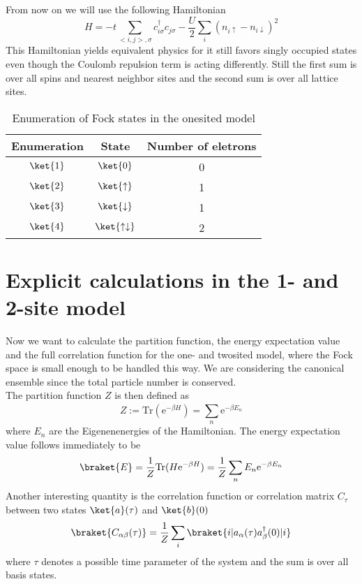 \noindent From now on we will use the following Hamiltonian 
\begin{equation}
	H = -t \sum_{<i,j>, \sigma} c_{i\sigma}^\dag c_{j\sigma} - \frac{U}{2} \sum_{i}(n_{i\uparrow} - n_{i\downarrow})^2 
	\label{Hnew}
\end{equation}
This Hamiltonian yields equivalent physics for it still favors singly occupied states even though the Coulomb repulsion term is acting differently. Still the first sum is over all spins and nearest neighbor sites and the second sum is over all lattice sites.
\newline
\begin{table}[H]
	\centering
	
	\begin{tabular}{ccc}
		
		\hline  
		Enumeration & State & Number of eletrons \\
		\hline
		$\ket{1}$ & $\ket{0}$ & 0\\
		$\ket{2}$ & $\ket{\uparrow}$ & 1\\
		$\ket{3}$ & $\ket{\downarrow}$ & 1\\
		$\ket{4}$ & $\ket{\uparrow\downarrow}$ & 2\\
	\end{tabular}
	\caption{Enumeration of Fock states in the onesited model}
	\label{fock1}
\end{table}
\section{Explicit calculations in the 1- and 2-site model}\label{analytic}
Now we want to calculate the partition function, the energy expectation value and the full correlation function for the one- and twosited model, where the Fock space is small enough to be handled this way. We are considering the canonical ensemble since the total particle number is conserved.\\
The partition function $Z$ is then defined as 
\begin{equation}
Z := \text{Tr}(\text{e}^{-\beta H}) = \sum_{n}^{}\text{e}^{-\beta E_n} \label{partition}
\end{equation}
where $E_n$ are the Eigenenenergies of the Hamiltonian. The energy expectation value follows immediately to be
\begin{equation}
\braket{E} = \frac{1}{Z}\text{Tr} (H\text{e}^{-\beta H}) =\frac{1}{Z} \sum_{n}^{} E_n\text{e}^{-\beta E_n} \label{energy}
\end{equation}
Another interesting quantity is the correlation function or correlation matrix $C_{\tau}$ between two states $\ket{a}(\tau)$ and $\ket{b}(0)$
\begin{equation}
	\braket{C_{\alpha\beta}(\tau)}= \frac{1}{Z}\sum_{i}^{}\braket{i|a_{\alpha}(\tau)a^{\dagger}_{\beta}(0)|i}	\label{correlator}
\end{equation}
where $\tau$ denotes a possible time parameter of the system and the sum is over all basis states.
